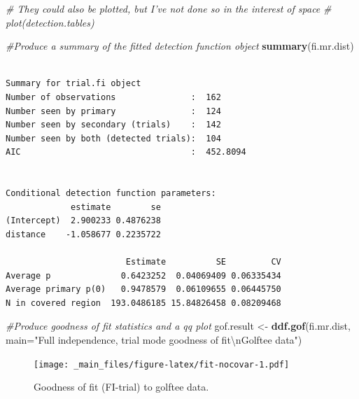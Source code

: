 \documentclass[]{book}
\newenvironment{Shaded}{\begin{snugshade}}{\end{snugshade}}
\newcommand{\KeywordTok}[1]{\textcolor[rgb]{0.13,0.29,0.53}{\textbf{#1}}}
\newcommand{\DataTypeTok}[1]{\textcolor[rgb]{0.13,0.29,0.53}{#1}}
\newcommand{\CharTok}[1]{\textcolor[rgb]{0.31,0.60,0.02}{#1}}
\newcommand{\StringTok}[1]{\textcolor[rgb]{0.31,0.60,0.02}{#1}}
\newcommand{\CommentTok}[1]{\textcolor[rgb]{0.56,0.35,0.01}{\textit{#1}}}
\newcommand{\OperatorTok}[1]{\textcolor[rgb]{0.81,0.36,0.00}{\textbf{#1}}}
\newcommand{\NormalTok}[1]{#1}
\theoremstyle{definition}
\theoremstyle{definition}
\theoremstyle{remark}
\begin{document}
\begin{Shaded}
\begin{Highlighting}[]
\CommentTok{# They could also be plotted, but I've not done so in the interest of space}
\CommentTok{# plot(detection.tables)}

\CommentTok{#Produce a summary of the fitted detection function object}
\KeywordTok{summary}\NormalTok{(fi.mr.dist)}
\end{Highlighting}
\end{Shaded}

\begin{verbatim}

Summary for trial.fi object 
Number of observations               :  162 
Number seen by primary               :  124 
Number seen by secondary (trials)    :  142 
Number seen by both (detected trials):  104 
AIC                                  :  452.8094 


Conditional detection function parameters:
             estimate        se
(Intercept)  2.900233 0.4876238
distance    -1.058677 0.2235722

                        Estimate          SE         CV
Average p              0.6423252  0.04069409 0.06335434
Average primary p(0)   0.9478579  0.06109655 0.06445750
N in covered region  193.0486185 15.84826458 0.08209468
\end{verbatim}

\begin{Shaded}
\begin{Highlighting}[]
\CommentTok{#Produce goodness of fit statistics and a qq plot}
\NormalTok{gof.result <-}\StringTok{ }\KeywordTok{ddf.gof}\NormalTok{(fi.mr.dist, }
                      \DataTypeTok{main=}\StringTok{"Full independence, trial mode goodness of fit}\CharTok{\textbackslash{}n}\StringTok{Golftee data"}\NormalTok{)}
\end{Highlighting}
\end{Shaded}

\begin{figure}
\centering
\texttt{[image: \_main\_files/figure-latex/fit-nocovar-1.pdf]}
\caption{\label{fig:fit-nocovar}Goodness of fit (FI-trial) to golftee data.}
\end{figure}

\begin{Shaded}
\end{Shaded}
\end{document}
